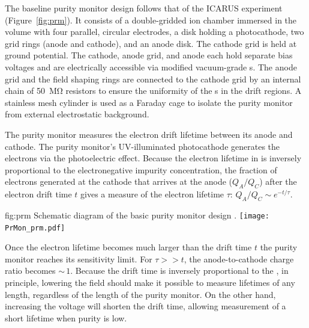 The  baseline purity monitor design follows that of  the ICARUS experiment (Figure~\ref{fig:prm})\cite{Adamowski:2014daa}.  It consists of a double-gridded ion chamber immersed in the \lar volume with four parallel, circular electrodes, a disk holding a photocathode, two grid rings (anode and cathode), and an anode disk. The cathode grid is held at ground potential. The cathode, anode grid, and anode 
each hold separate bias voltages and are electrically accessible via modified vacuum-grade  \fdth{}s. %
The anode grid and the field shaping rings are connected to the cathode grid by an internal chain of \SI{50}{\mega\ohm} resistors to ensure the uniformity of the \efield{}s in the drift regions. A stainless mesh cylinder is used as a Faraday cage to isolate the purity monitor from external electrostatic background. 

The purity monitor measures the electron drift lifetime between its anode and cathode. The purity monitor's UV-illuminated %
photocathode generates the electrons via the photoelectric effect. Because the electron lifetime in \lar is inversely proportional to the electronegative impurity concentration, the fraction of electrons generated at the cathode that arrives at the anode ($Q_A/Q_C$) after the electron drift time $t$ gives a measure of the electron lifetime $\tau$:
%
\( Q_A/Q_C \sim e^{-t/\tau}.\)



\begin{dunefigure}{fig:prm}
  {Schematic diagram of the basic purity monitor design \cite{Adamowski:2014daa}.}
  \texttt{[image: PrMon\_prm.pdf]}
\end{dunefigure}


%

Once the electron lifetime becomes much larger than the drift time $t$ the purity monitor reaches its sensitivity limit.  For $\tau >> t$, the anode-to-cathode charge ratio becomes $\sim\,1$. Because the drift time is inversely proportional to the \efield, in principle, lowering the %
field should make it possible to measure lifetimes of any length, regardless of the length of the purity monitor.
On the other hand, increasing the voltage will shorten the drift time, allowing measurement of a short lifetime when purity is low. 

